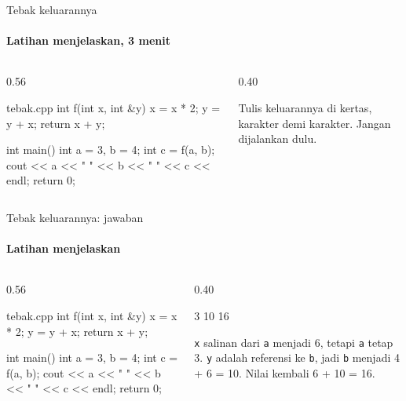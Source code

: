 \documentclass[t]{beamer}
\begin{document}
\begin{frame}[fragile]{Tebak keluarannya}
\framesubtitle{Latihan menjelaskan, 3 menit}
\begin{columns}[T]
\begin{column}{0.56\textwidth}
\begin{Kode}[listing options={style=ITERACodeKecil}]{tebak.cpp}
int f(int x, int &y) {
    x = x * 2;
    y = y + x;
    return x + y;
}

int main() {
    int a = 3, b = 4;
    int c = f(a, b);
    cout << a << " " << b << " " << c << endl;
    return 0;
}
\end{Kode}
\end{column}
\begin{column}{0.40\textwidth}
\begin{Catatan}
Tulis keluarannya di kertas, karakter demi karakter. Jangan dijalankan dulu.
\end{Catatan}
\end{column}
\end{columns}
\end{frame}

\begin{frame}[fragile]{Tebak keluarannya: jawaban}
\framesubtitle{Latihan menjelaskan}
\begin{columns}[T]
\begin{column}{0.56\textwidth}
\begin{Kode}[listing options={style=ITERACodeKecil}]{tebak.cpp}
int f(int x, int &y) {
    x = x * 2;
    y = y + x;
    return x + y;
}

int main() {
    int a = 3, b = 4;
    int c = f(a, b);
    cout << a << " " << b << " " << c << endl;
    return 0;
}
\end{Kode}
\end{column}
\begin{column}{0.40\textwidth}
\begin{Keluaran}[]
3 10 16
\end{Keluaran}
\begin{Catatan}
\texttt{x} salinan dari \texttt{a} menjadi 6, tetapi \texttt{a} tetap 3. \texttt{y} adalah referensi ke \texttt{b}, jadi \texttt{b} menjadi 4 + 6 = 10. Nilai kembali 6 + 10 = 16.
\end{Catatan}
\end{column}
\end{columns}
\end{frame}
\end{document}
